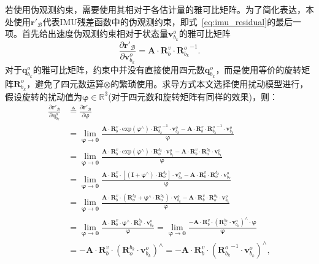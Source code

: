 若使用伪观测约束，需要使用其相对于各估计量的雅可比矩阵。为了简化表达，本处使用$\symbf{r}'_{\mathcal{B}}$代表IMU残差函数中的伪观测约束，即式~\eqref{eq:imu_residual}的最后一项。首先给出速度伪观测约束相对于状态量$\symbf{v}_{b_{k}}^o$的雅可比矩阵
\begin{equation}
  \frac{\partial \symbf{r}'_{\mathcal{B}}}{\partial \symbf{v}_{b_{k}}^o} = \symbf{A} \cdot \symbf{R}_b^v \cdot {\symbf{R}_{b_k}^o}^{-1}.
\end{equation}
对于$\symbf{q}_{b_{k}}^o$的雅可比矩阵，约束中并没有直接使用四元数$\symbf{q}_{b_{k}}^o$，而是使用等价的旋转矩阵$\symbf{R}_{b_{k}}^o$，避免了四元数运算$\otimes$的繁琐使用。求导方式本文选择使用扰动模型\cite{imu_preintegration}进行，假设旋转的扰动值为$\symbf{\varphi } \in \mathbb{R}^3$(对于四元数和旋转矩阵有同样的效果)，则：
\begin{align}
  \frac{\partial \symbf{r}'_{\mathcal{B}}}{\partial \symbf{q}_{b_{k}}^o} &\triangleq  \frac{\partial \symbf{r}'_{\mathcal{B}}}{\partial \symbf{\varphi }} \\
  &= \lim\limits_{\symbf{\varphi } \to \symbf{0}} \frac{\symbf{A} \cdot \symbf{R}_b^v \cdot {\text{exp}(\symbf{\varphi }^{\land}) \cdot {\symbf{R}_{b_k}^o}^{-1}} \cdot \symbf{v}_{b_k}^o - \symbf{A} \cdot \symbf{R}_b^v \cdot {{\symbf{R}_{b_k}^o}^{-1}} \cdot \symbf{v}_{b_k}^o}{\symbf{\varphi }} \\
  &= \lim\limits_{\symbf{\varphi } \to \symbf{0}} \frac{\symbf{A} \cdot \symbf{R}_b^v \cdot {\text{exp}(\symbf{\varphi }^{\land}) \cdot \symbf{R}^{b_k}_o} \cdot \symbf{v}_{b_k}^o - \symbf{A} \cdot \symbf{R}_b^v \cdot {\symbf{R}^{b_k}_o} \cdot \symbf{v}_{b_k}^o}{\symbf{\varphi }} \\
  &= \lim\limits_{\symbf{\varphi } \to \symbf{0}} \frac{\symbf{A} \cdot \symbf{R}_b^v \cdot {[(\symbf{I} + \symbf{\varphi }^{\land}) \cdot \symbf{R}^{b_k}_o]} \cdot \symbf{v}_{b_k}^o - \symbf{A} \cdot \symbf{R}_b^v \cdot {\symbf{R}^{b_k}_o} \cdot \symbf{v}_{b_k}^o}{\symbf{\varphi }} \\
  &= \lim\limits_{\symbf{\varphi } \to \symbf{0}} \frac{\symbf{A} \cdot \symbf{R}_b^v \cdot {({\symbf{R}^{b_k}_o} + \symbf{\varphi }^{\land} \cdot \symbf{R}^{b_k}_o)} \cdot \symbf{v}_{b_k}^o - \symbf{A} \cdot \symbf{R}_b^v \cdot {\symbf{R}^{b_k}_o} \cdot \symbf{v}_{b_k}^o}{\symbf{\varphi }} \\
  &= \lim\limits_{\symbf{\varphi } \to \symbf{0}} \frac{\symbf{A} \cdot \symbf{R}_b^v \cdot {\symbf{\varphi }^{\land} \cdot \symbf{R}^{b_k}_o} \cdot \symbf{v}_{b_k}^o}{\symbf{\varphi }}
  = \lim\limits_{\symbf{\varphi } \to \symbf{0}} \frac{-\symbf{A} \cdot \symbf{R}_b^v \cdot ({\symbf{R}^{b_k}_o} \cdot \symbf{v}_{b_k}^{o})^{\land} \cdot \symbf{\varphi}}{\symbf{\varphi }} \\
  &= -\symbf{A} \cdot \symbf{R}_b^v \cdot ({\symbf{R}^{b_k}_o} \cdot \symbf{v}_{b_k}^{o})^{\land}
  = -\symbf{A} \cdot \symbf{R}_b^v \cdot ({\symbf{R}_{b_k}^o}^{-1} \cdot \symbf{v}_{b_k}^{o})^{\land},
\end{align}

